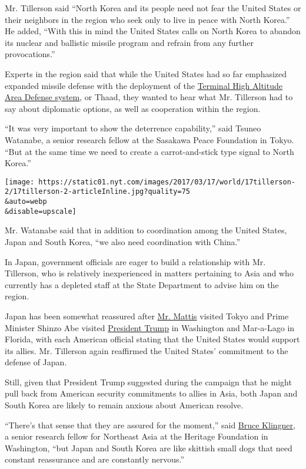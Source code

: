 Mr. Tillerson said ``North Korea and its people need not fear the United
States or their neighbors in the region who seek only to live in peace
with North Korea.'' He added, ``With this in mind the United States
calls on North Korea to abandon its nuclear and ballistic missile
program and refrain from any further provocations.''

Experts in the region said that while the United States had so far
emphasized expanded missile defense with the deployment of the
\href{http://www.lockheedmartin.com/us/products/thaad.html}{Terminal
High Altitude Area Defense system}, or Thaad, they wanted to hear what
Mr. Tillerson had to say about diplomatic options, as well as
cooperation within the region.

``It was very important to show the deterrence capability,'' said Tsuneo
Watanabe, a senior research fellow at the Sasakawa Peace Foundation in
Tokyo. ``But at the same time we need to create a carrot-and-stick type
signal to North Korea.''

\texttt{[image: https://static01.nyt.com/images/2017/03/17/world/17tillerson-2/17tillerson-2-articleInline.jpg?quality=75\\\&auto=webp\\\&disable=upscale]}

Mr. Watanabe said that in addition to coordination among the United
States, Japan and South Korea, ``we also need coordination with China.''

In Japan, government officials are eager to build a relationship with
Mr. Tillerson, who is relatively inexperienced in matters pertaining to
Asia and who currently has a depleted staff at the State Department to
advise him on the region.

Japan has been somewhat reassured after
\href{https://www.nytimes.com/2017/02/04/world/asia/jim-mattis-defense-iran-persian-gulf.html}{Mr.
Mattis} visited Tokyo and Prime Minister Shinzo Abe visited
\href{https://www.nytimes.com/2017/02/13/world/asia/trump-japan-shinzo-abe.html}{President
Trump} in Washington and Mar-a-Lago in Florida, with each American
official stating that the United States would support its allies. Mr.
Tillerson again reaffirmed the United States' commitment to the defense
of Japan.

Still, given that President Trump suggested during the campaign that he
might pull back from American security commitments to allies in Asia,
both Japan and South Korea are likely to remain anxious about American
resolve.

``There's that sense that they are assured for the moment,'' said
\href{http://www.heritage.org/staff/bruce-klingner}{Bruce Klingner}, a
senior research fellow for Northeast Asia at the Heritage Foundation in
Washington, ``but Japan and South Korea are like skittish small dogs
that need constant reassurance and are constantly nervous.''

